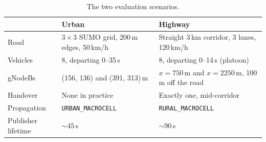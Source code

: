 
\begin{table}[htbp]
  \centering
  \caption{The two evaluation scenarios.}
  \label{tab:scenarios}
  \begin{tabular}{@{}lll@{}}
    \toprule
                        & \textbf{Urban}                       & \textbf{Highway} \\
    \midrule
    Road                & $3\times3$ SUMO grid, 200\,m edges, 50\,km/h
                        & Straight 3\,km corridor, 3 lanes, 120\,km/h \\
    Vehicles            & 8, departing 0--35\,s                & 8, departing 0--14\,s (platoon) \\
    gNodeBs             & (156, 136) and (391, 313)\,m         & $x = 750$\,m and $x = 2250$\,m, 100\,m off the road \\
    Handover            & None in practice                     & Exactly one, mid-corridor \\
    Propagation         & \texttt{URBAN\_MACROCELL}            & \texttt{RURAL\_MACROCELL} \\
    Publisher lifetime  & ${\sim}45$\,s                        & ${\sim}90$\,s \\
    \bottomrule
  \end{tabular}
\end{table}



